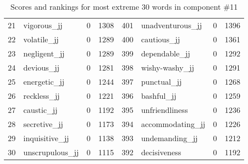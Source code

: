 \begin{table}[tbp]
\begin{tabular}{| rlr@{.}l | rlr@{.}l |}
    21 & vigorous\_jj & 0 & 1308    &    401 & unadventurous\_jj & 0 & 1396 \\
    22 & volatile\_jj & 0 & 1289    &    400 & cautious\_jj & 0 & 1361 \\
    23 & negligent\_jj & 0 & 1289    &    399 & dependable\_jj & 0 & 1292 \\
    24 & devious\_jj & 0 & 1281    &    398 & wishy-washy\_jj & 0 & 1291 \\
    25 & energetic\_jj & 0 & 1244    &    397 & punctual\_jj & 0 & 1268 \\
    26 & reckless\_jj & 0 & 1221    &    396 & bashful\_jj & 0 & 1259 \\
    27 & caustic\_jj & 0 & 1192    &    395 & unfriendliness & 0 & 1236 \\
    28 & secretive\_jj & 0 & 1173    &    394 & accommodating\_jj & 0 & 1226 \\
    29 & inquisitive\_jj & 0 & 1138    &    393 & undemanding\_jj & 0 & 1212 \\
    30 & unscrupulous\_jj & 0 & 1115    &    392 & decisiveness & 0 & 1192 \\
    \hline
    \end{tabular}
    \caption{Scores and rankings for most extreme 30 words in component \#11} 
\end{table}
\clearpage
